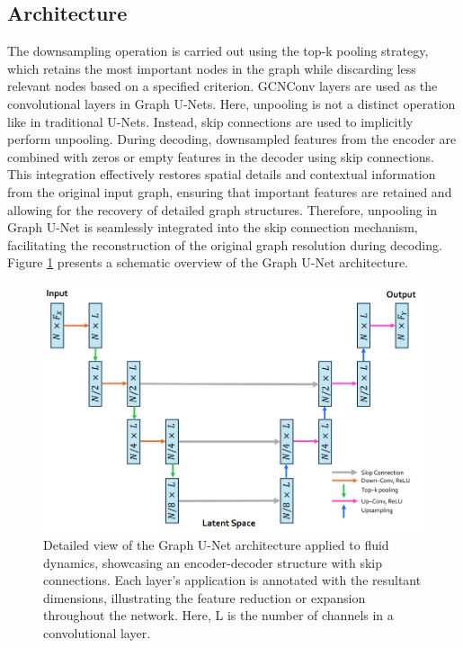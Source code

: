 \subsection{Architecture}
The downsampling operation is carried out using the top-k pooling strategy, which retains the most important nodes in the graph while discarding less relevant nodes based on a specified criterion. GCNConv layers are used as the convolutional layers in Graph U-Nets. Here, unpooling is not a distinct operation like in traditional U-Nets. Instead, skip connections are used to implicitly perform unpooling. During decoding, downsampled features from the encoder are combined with zeros or empty features in the decoder using skip connections. This integration effectively restores spatial details and contextual information from the original input graph, ensuring that important features are retained and allowing for the recovery of detailed graph structures. Therefore, unpooling in Graph U-Net is seamlessly integrated into the skip connection mechanism, facilitating the reconstruction of the original graph resolution during decoding. Figure \ref{fig:GraphUnet} presents a schematic overview of the Graph U-Net architecture. 
\begin{figure}[ht]
    \centering
    \includegraphics[width=12cm]{images/Methodology/GraphUNet.png}
    \caption{Detailed view of the Graph U-Net architecture applied to fluid dynamics, showcasing an encoder-decoder structure with skip connections. Each layer’s application is annotated with the resultant dimensions, illustrating the feature reduction or expansion throughout the network. Here, L is the number of channels in a convolutional layer.}
    \label{fig:GraphUnet}
\end{figure}
